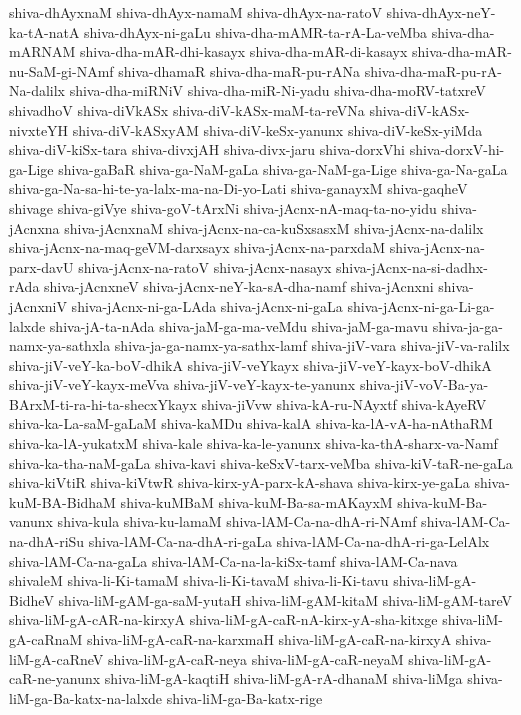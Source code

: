 {shiva-dhAyxnaM
shiva-dhAyx-namaM
shiva-dhAyx-na-ratoV
shiva-dhAyx-neY-ka-tA-natA
shiva-dhAyx-ni-gaLu
shiva-dha-mAMR-ta-rA-La-veMba
shiva-dha-mARNAM
shiva-dha-mAR-dhi-kasayx
shiva-dha-mAR-di-kasayx
shiva-dha-mAR-nu-SaM-gi-NAmf
shiva-dhamaR
shiva-dha-maR-pu-rANa
shiva-dha-maR-pu-rA-Na-dalilx
shiva-dha-miRNiV
shiva-dha-miR-Ni-yadu
shiva-dha-moRV-tatxreV
shivadhoV
shiva-diVkASx
shiva-diV-kASx-maM-ta-reVNa
shiva-diV-kASx-nivxteYH
shiva-diV-kASxyAM
shiva-diV-keSx-yanunx
shiva-diV-keSx-yiMda
shiva-diV-kiSx-tara
shiva-divxjAH
shiva-divx-jaru
shiva-dorxVhi
shiva-dorxV-hi-ga-Lige
shiva-gaBaR
shiva-ga-NaM-gaLa
shiva-ga-NaM-ga-Lige
shiva-ga-Na-gaLa
shiva-ga-Na-sa-hi-te-ya-lalx-ma-na-Di-yo-Lati
shiva-ganayxM
shiva-gaqheV
shivage
shiva-giVye
shiva-goV-tArxNi
shiva-jAcnx-nA-maq-ta-no-yidu
shiva-jAcnxna
shiva-jAcnxnaM
shiva-jAcnx-na-ca-kuSxsasxM
shiva-jAcnx-na-dalilx
shiva-jAcnx-na-maq-geVM-darxsayx
shiva-jAcnx-na-parxdaM
shiva-jAcnx-na-parx-davU
shiva-jAcnx-na-ratoV
shiva-jAcnx-nasayx
shiva-jAcnx-na-si-dadhx-rAda
shiva-jAcnxneV
shiva-jAcnx-neY-ka-sA-dha-namf
shiva-jAcnxni
shiva-jAcnxniV
shiva-jAcnx-ni-ga-LAda
shiva-jAcnx-ni-gaLa
shiva-jAcnx-ni-ga-Li-ga-lalxde
shiva-jA-ta-nAda
shiva-jaM-ga-ma-veMdu
shiva-jaM-ga-mavu
shiva-ja-ga-namx-ya-sathxla
shiva-ja-ga-namx-ya-sathx-lamf
shiva-jiV-vara
shiva-jiV-va-ralilx
shiva-jiV-veY-ka-boV-dhikA
shiva-jiV-veYkayx
shiva-jiV-veY-kayx-boV-dhikA
shiva-jiV-veY-kayx-meVva
shiva-jiV-veY-kayx-te-yanunx
shiva-jiV-voV-Ba-ya-BArxM-ti-ra-hi-ta-shecxYkayx
shiva-jiVvw
shiva-kA-ru-NAyxtf
shiva-kAyeRV
shiva-ka-La-saM-gaLaM
shiva-kaMDu
shiva-kalA
shiva-ka-lA-vA-ha-nAthaRM
shiva-ka-lA-yukatxM
shiva-kale
shiva-ka-le-yanunx
shiva-ka-thA-sharx-va-Namf
shiva-ka-tha-naM-gaLa
shiva-kavi
shiva-keSxV-tarx-veMba
shiva-kiV-taR-ne-gaLa
shiva-kiVtiR
shiva-kiVtwR
shiva-kirx-yA-parx-kA-shava
shiva-kirx-ye-gaLa
shiva-kuM-BA-BidhaM
shiva-kuMBaM
shiva-kuM-Ba-sa-mAKayxM
shiva-kuM-Ba-vanunx
shiva-kula
shiva-ku-lamaM
shiva-lAM-Ca-na-dhA-ri-NAmf
shiva-lAM-Ca-na-dhA-riSu
shiva-lAM-Ca-na-dhA-ri-gaLa
shiva-lAM-Ca-na-dhA-ri-ga-LelAlx
shiva-lAM-Ca-na-gaLa
shiva-lAM-Ca-na-la-kiSx-tamf
shiva-lAM-Ca-nava
shivaleM
shiva-li-Ki-tamaM
shiva-li-Ki-tavaM
shiva-li-Ki-tavu
shiva-liM-gA-BidheV
shiva-liM-gAM-ga-saM-yutaH
shiva-liM-gAM-kitaM
shiva-liM-gAM-tareV
shiva-liM-gA-cAR-na-kirxyA
shiva-liM-gA-caR-nA-kirx-yA-sha-kitxge
shiva-liM-gA-caRnaM
shiva-liM-gA-caR-na-karxmaH
shiva-liM-gA-caR-na-kirxyA
shiva-liM-gA-caRneV
shiva-liM-gA-caR-neya
shiva-liM-gA-caR-neyaM
shiva-liM-gA-caR-ne-yanunx
shiva-liM-gA-kaqtiH
shiva-liM-gA-rA-dhanaM
shiva-liMga
shiva-liM-ga-Ba-katx-na-lalxde
shiva-liM-ga-Ba-katx-rige
}
